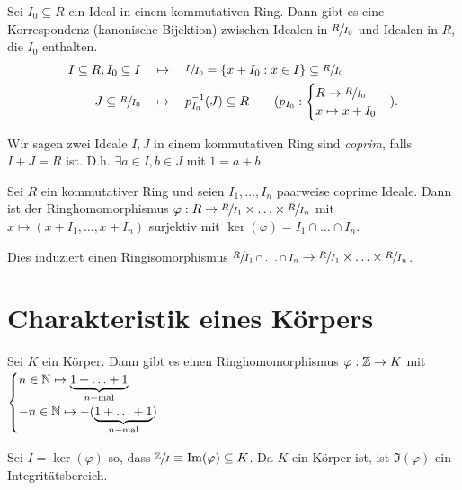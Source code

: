 \begin{remark}
	Sei $I_{0} \subseteq R$ ein Ideal in einem kommutativen Ring.
	Dann gibt es eine Korrespondenz (kanonische Bijektion) zwischen Idealen in $\sfrac{R}{I_{0}}$ und Idealen in $R$, die $I_0$ enthalten.
	\begin{align*}
		I \subseteq R, I_0 \subseteq I \quad &\mapsto \quad \sfrac{I}{I_0} = \{x+ I_0: x \in I\} \subseteq \sfrac{R}{I_0}\\
		J \subseteq \sfrac{R}{I_0} \quad &\mapsto \quad p_{I_0}^{-1}(J) \subseteq R \qquad (p_{I_0}: \begin{cases}
			R \to \sfrac{R}{I_0}\\
			x \mapsto x + I_0
		\end{cases})
	.\end{align*}
\end{remark}

\begin{definition}
	Wir sagen zwei Ideale $I, J$ in einem kommutativen Ring sind \emph{coprim}, falls $I+J = R$ ist.
	D.h. $\exists a \in I, b \in J $ mit $1 = a + b$.
\end{definition}


\begin{proposition}
	Sei $R$ ein kommutativer Ring und seien $I_1, \ldots, I_{n}$ paarweise coprime Ideale.
	Dann ist der Ringhomomorphismus $\varphi: R \to \sfrac{R}{I_1} \times  \ldots \times \sfrac{R}{I_{n}}$ mit
	$x \mapsto (x+I_1,\ldots,x+I_{n})$ surjektiv mit $\ker(\varphi) = I_1 \cap \ldots \cap I_{n}$.

	Dies induziert einen Ringisomorphismus $\sfrac{R}{I_1 \cap \ldots \cap I_{n}} \to  \sfrac{R}{I_1} \times \ldots \times \sfrac{R}{I_{n}}$.
\end{proposition}


\section{Charakteristik eines Körpers}
Sei $K$ ein Körper. Dann gibt es einen Ringhomomorphismus $ \varphi: \mathbb{Z} \to K$ mit $\begin{cases}
	n \in \mathbb{N} \mapsto \underbrace{1+\ldots+1}_{n-\text{mal}}\\
	-n \in \mathbb{N} \mapsto -(\underbrace{1+\ldots+1}_{n-\text{mal}})
\end{cases}$

Sei $I = \ker(\varphi)$ so, dass $\sfrac{\mathbb{Z}}{I} \equiv \Im(\varphi) \subseteq K$.
Da $K$ ein Körper ist, ist $\Im(\varphi)$ ein Integritätsbereich.


